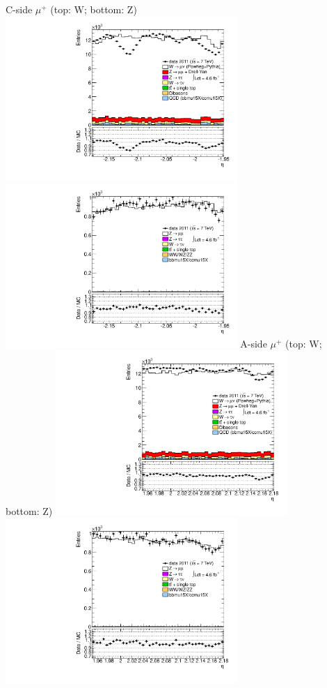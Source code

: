  {
\colb[T]
C-side $\mu^{+}$ (top: W; bottom: Z)
\centering
\includegraphics[width=0.66\textwidth]{dates/20130306/figures/both/W_10_C_stack_l_eta_POS} \\
\includegraphics[width=0.66\textwidth]{dates/20130306/figures/both/Z_10_C_stack_lP_eta_ALL.pdf}
A-side $\mu^{+}$ (top: W; bottom: Z)
\centering
\includegraphics[width=0.66\textwidth]{dates/20130306/figures/both/W_10_A_stack_l_eta_POS} \\
\includegraphics[width=0.66\textwidth]{dates/20130306/figures/both/Z_10_A_stack_lP_eta_ALL.pdf} 
\cole
}

